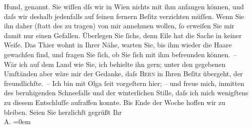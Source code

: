 \begin{ledgroupsized}[t]{13cm}
               Hund, \textsc{\label{K_L01265-1v}\label{K_L01265-1h}} genannt. Sie wiſſen dſs wir in Wien nichts
               mit ihm anfangen können, und daſs wir deshalb jedenfalls auf ſeinen fernern Beſitz
               verzichten {\pb}müſſen. Wenn Sie ihn daher (ſtatt des
                  \label{K_L01265-2v}\label{K_L01265-2h} zu tragen) von mir annehmen wollen, ſo erweiſen Sie
               mir damit nur einen Gefallen. Überlegen Sie ſichs, denn Eile hat die Sache in keiner
               Weiſe. Das Thier wohnt in Ihrer Nähe, warten Sie, bis ihm wieder {\pb}die Haare gewachſen ſind, und fragen Sie ſich, ob Sie
               ſich mit ihm befreunden können. – Wär ich auf dem Land wie Sie, ich behielte ihn
               gern; unter den gegebenen Umſtänden aber wäre mir der Gedanke, daſs \textsc{Bern} in Ihren Beſitz übergeht, der freundlichſte. –\pend
           \pstart
           {\pb}Ich bin mit Olga ſeit vorgeſtern hier; – und freue mich, inmitten des beruhigenden
               Schneefalls und der winterlichen Stille, daſs ich mich wenigſtens zu diesem
               Entschluſſe aufraffen konnte. Bis Ende der Woche hoffen wir zu bleiben.\pend
           \pstart
           Seien Sie herzlichſt gegrüßt\pend
           \pstart
           Ihr{\\[\baselineskip]}\spacefill\mbox{A.}\pend
           \leftskip=0em{}
         
         \endnumbering{}\end{ledgroupsized}  \newcommand{\dateiname}{L01265}\newcommand{\titel}{Arthur Schnitzler an Richard Beer-Hofmann, 14. 1. 1903}\newcommand{\editorInnen}{Martin Anton Müller und Gerd-Hermann Susen}
      